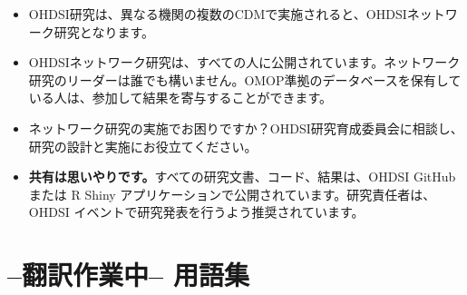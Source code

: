 \documentclass[
  11pt]{book}
\makeatletter
\providecommand{\tightlist}{%
  \setlength{\itemsep}{0pt}\setlength{\parskip}{0pt}}
\newenvironment{kframe}{%
\medskip{}
\setlength{\fboxsep}{.8em}
 \def\at@end@of@kframe{}%
 \ifinner\ifhmode%
  \def\at@end@of@kframe{\end{minipage}}%
  \begin{minipage}{\columnwidth}%
 \fi\fi%
 \def\FrameCommand##1{\hskip\@totalleftmargin \hskip-\fboxsep
 \colorbox{myShadeColor}{##1}\hskip-\fboxsep
     \hskip-\linewidth \hskip-\@totalleftmargin \hskip\columnwidth}%
 \MakeFramed {\advance\hsize-\width
   \@totalleftmargin\z@ \linewidth\hsize
   \@setminipage}}%
 {\par\unskip\endMakeFramed%
 \at@end@of@kframe}
\newenvironment{rmdblock}[1]
  {
  \begin{itemize}
  \renewcommand{\labelitemi}{
    \raisebox{-.7\height}[0pt][0pt]{
      {\setkeys{Gin}{width=3em,keepaspectratio}\texttt{[image: images/\#1]}}
    }
  }
  \setlength{\fboxsep}{1em}
  \begin{kframe}
  \item
  }
  {
  \end{kframe}
  \end{itemize}
  }
\newenvironment{rmdsummary}
  {\begin{rmdblock}{summary}}
  {\end{rmdblock}}
\theoremstyle{definition}
\theoremstyle{definition}
\theoremstyle{definition}
\theoremstyle{definition}
\theoremstyle{remark}
\makeatother
\begin{document}
\begin{rmdsummary}
\begin{itemize}
\tightlist
\item
  OHDSI研究は、異なる機関の複数のCDMで実施されると、OHDSIネットワーク研究となります。
\item
  OHDSIネットワーク研究は、すべての人に公開されています。ネットワーク研究のリーダーは誰でも構いません。OMOP準拠のデータベースを保有している人は、参加して結果を寄与することができます。
\item
  ネットワーク研究の実施でお困りですか？OHDSI研究育成委員会に相談し、研究の設計と実施にお役立てください。
\item
  \textbf{共有は思いやりです。}すべての研究文書、コード、結果は、OHDSI GitHub または R Shiny アプリケーションで公開されています。研究責任者は、OHDSI イベントで研究発表を行うよう推奨されています。
\end{itemize}
\end{rmdsummary}

\appendix {}


\chapter{--翻訳作業中-- 用語集}\label{Glossary}
\end{document}
